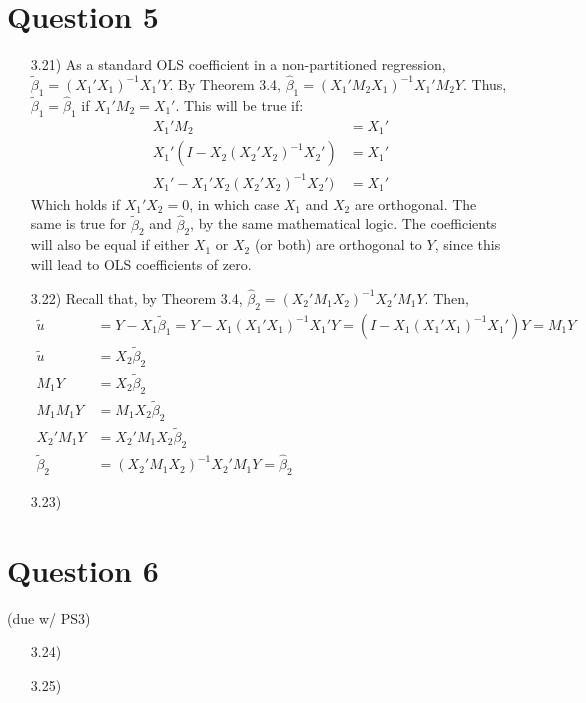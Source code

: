 \documentclass{article}
\renewcommand{\tilde}[1]{\widetilde{#1}}
\newcommand{\tb}{\tilde{\beta}}
\newcommand{\bhat}{\hat{\beta}}
\begin{document}
\section*{Question 5}
\begin{itemize}
	\item[3.21)] As a standard OLS coefficient in a non-partitioned regression, ${\tb_1=(X_1'X_1)^{-1}X_1'Y}$. By Theorem 3.4, ${\bhat_1 = (X_1'M_2X_1)^{-1}X_1'M_2Y}$. Thus, ${\tb_1=\bhat_1}$ if ${X_1'M_2=X_1'}$. This will be true if:
		\begin{align*}
			X_1'M_2								&= X_1'	\\
			X_1'(I - X_2(X_2'X_2)^{-1}X_2')		&= X_1'	\\
			X_1' - X_1'X_2(X_2'X_2)^{-1}X_2')	&= X_1'
		\end{align*}
		Which holds if ${X_1'X_2=0}$, in which case $X_1$ and $X_2$ are orthogonal. The same is true for $\tb_2$ and $\bhat_2$, by the same mathematical logic. The coefficients will also be equal if either $X_1$ or $X_2$ (or both) are orthogonal to $Y$, since this will lead to OLS coefficients of zero.
	
	\item[3.22)] Recall that, by Theorem 3.4, ${\bhat_2 = (X_2'M_1X_2)^{-1}X_2'M_1Y}$. Then,
		\begin{align*}
			\tilde{u} 	&= Y-X_1\tb_1 = Y - X_1(X_1'X_1)^{-1}X_1'Y = (I - X_1(X_1'X_1)^{-1}X_1')Y = M_1Y	\\
			\tilde{u} 	&= X_2\tb_2	\\
			M_1Y 		&= X_2\tb_2	\\
			M_1M_1Y		&= M_1X_2\tb_2\\
			X_2'M_1Y	&= X_2'M_1X_2\tb_2\\
			\tb_2		&= (X_2'M_1X_2)^{-1}X_2'M_1Y = \bhat_2
		\end{align*}
	
	\item[3.23)]
	
\end{itemize}


\section*{Question 6}
(due w/ PS3)
\begin{itemize}
	\item[3.24)]
	
	\item[3.25)]
	
\end{itemize}
\end{document}
